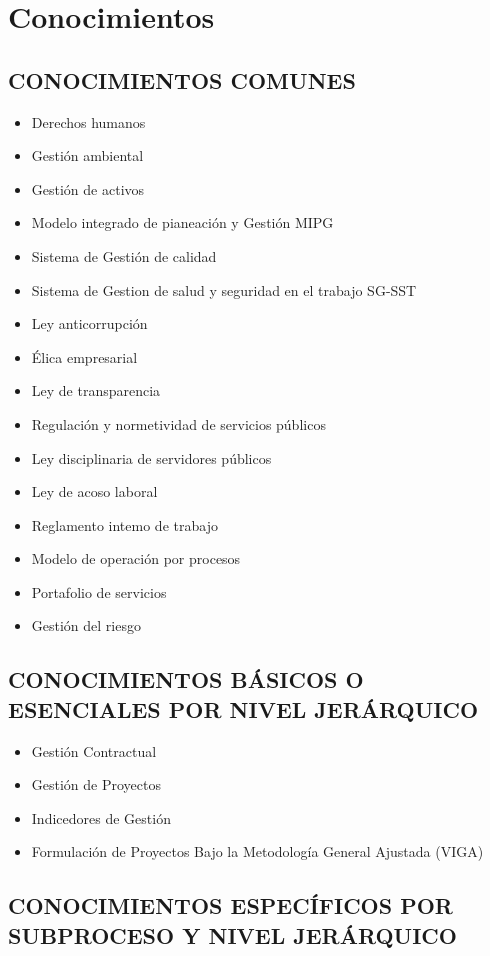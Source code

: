 \documentclass[a5paper]{book}%
\begin{document}
\section{Conocimientos}

\subsection{CONOCIMIENTOS COMUNES}

\begin{itemize}
\item Derechos humanos
\item Gestión ambiental
\item Gestión de activos
\item Modelo integrado de pianeación y Gestión MIPG
\item Sistema de Gestión de calidad
\item Sistema de Gestion de salud y seguridad en el trabajo SG-SST
\item Ley anticorrupción
\item Élica empresarial
\item Ley de transparencia
\item Regulación y normetividad de servicios públicos
\item Ley disciplinaria de servidores públicos
\item Ley de acoso laboral
\item Reglamento intemo de trabajo
\item Modelo de operación por procesos
\item Portafolio de servicios
\item Gestión del riesgo
\end{itemize}

\subsection{CONOCIMIENTOS  BÁSICOS O ESENCIALES  POR NIVEL JERÁRQUICO}


\begin{itemize}
\item Gestión Contractual
\item  Gestión de Proyectos
\item Indicedores de Gestión
\item Formulación de Proyectos Bajo la Metodología General Ajustada (VIGA)
\end{itemize}

\subsection{CONOCIMIENTOS ESPECÍFICOS POR SUBPROCESO Y NIVEL JERÁRQUICO}
\end{document}

